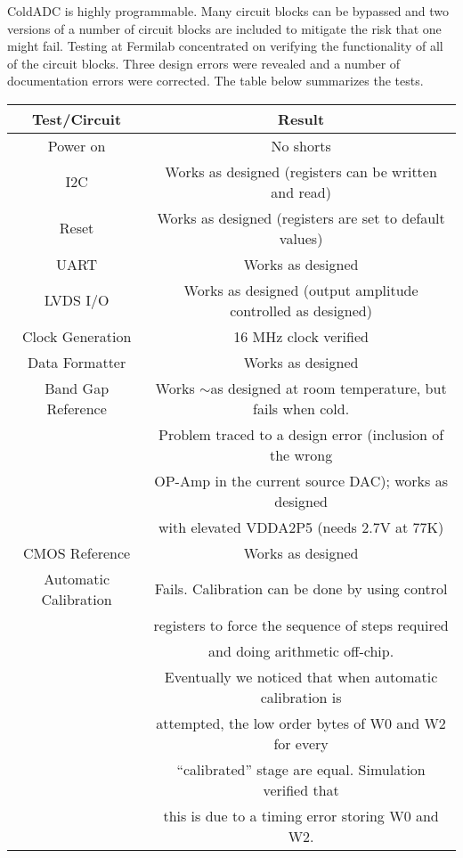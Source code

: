 \label{sec:3}

ColdADC is highly programmable.  Many circuit blocks can be bypassed and two versions of a number of circuit blocks are included to mitigate the risk that one might fail.  Testing at Fermilab concentrated on verifying the functionality of all of the circuit blocks.  Three design errors were revealed and a number of documentation errors were corrected.  The table below summarizes the tests.
 
 \begin{table}[h]
\centering
\begin{tabular}{|c|c|}
\hline
\textbf{ Test/Circuit} & Result  \\ \hline \hline
Power on &  No shorts \\ \hline
I2C & Works as designed (registers can be written and read) \\ \hline
Reset & Works as designed (registers are set to default values) \\ \hline
UART & Works as designed \\ \hline
LVDS I/O & Works as designed (output amplitude controlled as designed) \\ \hline
Clock Generation & 16 MHz clock verified \\ \hline
Data Formatter & Works as designed \\ \hline
Band Gap Reference & Works $\sim$as designed at room temperature, but fails when cold. \\ 
 & Problem traced to a design error (inclusion of the wrong \\ 
 &  OP-Amp in the current source DAC); works as designed \\ 
 &  with elevated VDDA2P5 (needs 2.7V at 77K) \\ \hline
 CMOS Reference & Works as designed \\ \hline
 Automatic Calibration & Fails.  Calibration can be done by using control \\ 
  & registers to force the sequence of steps required \\ 
   & and doing arithmetic off-chip.\\ 
    & Eventually we noticed that when automatic calibration is \\ 
     & attempted, the low order bytes of W0 and W2 for every \\ 
      & ``calibrated'' stage are equal. Simulation verified that  \\ 
       & this is due to a timing error storing W0 and W2. \\ \hline

\end{tabular}
\end{table}
